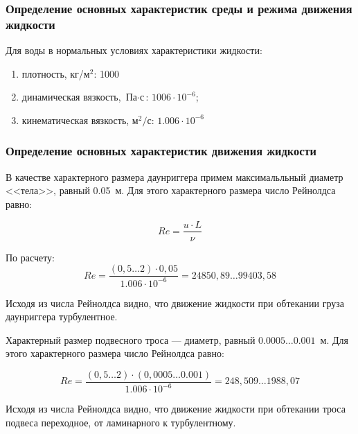 \documentclass[russian,utf8, pointsubsection]{eskdtext}
\begin{document}
\subsubsection{Определение основных характеристик среды и режима движения жидкости}
Для воды в нормальных условиях характеристики жидкости:
\begin{enumerate}
\item плотность, кг/м$^2$: 1000
\item динамическая вязкость, $\text{Па}\cdot\text{с}$: $1006\cdot10^{-6}$; \cite{waterProps}
\item кинематическая вязкость, $\text{м}^2/\text{с}$: $1.006\cdot10^{-6}$ \cite{waterProps}
\end{enumerate}

\subsubsection{Определение основных характеристик движения жидкости}
В качестве характерного размера даунриггера примем максимальльный диаметр <<тела>>, равный 0.05~м. Для этого характерного размера число Рейнолдса равно:

\begin{equation}
Re = \frac{u\cdot{L}}{\nu} 
\end{equation}

По расчету:
\begin{equation}
Re = \frac{(0,5\dots2)\cdot{0,05}}{1.006\cdot10^{-6}}=24850,89\dots99403,58
\end{equation}

Исходя из числа Рейнолдса видно, что движение жидкости при обтекании груза даунриггера турбулентное.

Характерный размер подвесного троса --- диаметр, равный $0.0005\dots0.001$~м. Для этого характерного размера число Рейнолдса равно:

\begin{equation}
Re = \frac{(0,5\dots2)\cdot{(0,0005\dots0.001)}}{1.006\cdot10^{-6}}=248,509\dots1988,07
\end{equation}

Исходя из числа Рейнолдса видно, что движение жидкости при обтекании троса подвеса переходное, от ламинарного к турбулентному.





\end{document}
